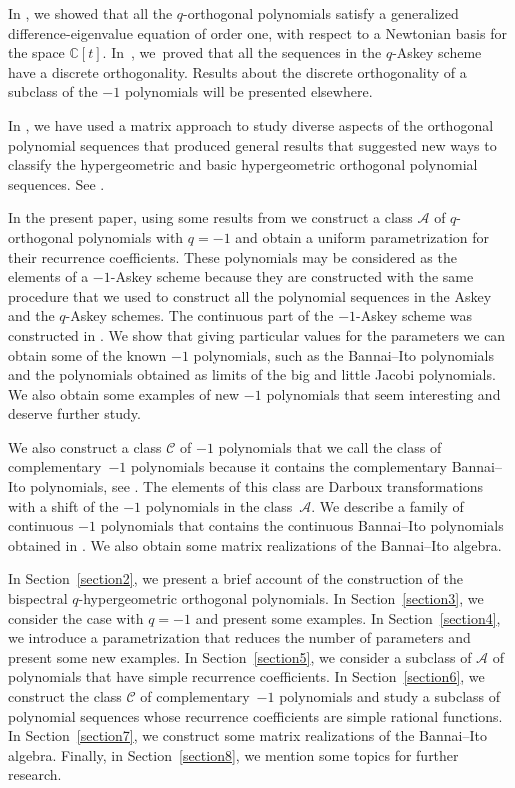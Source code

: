 \documentclass[pdftex]{sigma}
\def\cA{\mathcal A}
\def\cC{\mathcal C}
\numberwithin{equation}{section}
\begin{document}
In \cite{Uni}, we showed that all the $q$-orthogonal polynomials sat\-isfy a gen\-er\-al\-ized dif\-fer\-ence-eigenvalue equation of order one, with respect to a Newtonian basis for the space ${\mathbb C}[t]$. In~\cite{qdiscr}, we~proved that all the sequences in the $q$-Askey scheme have a discrete orthogonality. Results about the discrete orthogonality of a subclass of the $-1$ polynomials will be presented elsewhere.

In \cite{Mops, Rec, PSGH,Uni}, we have used a matrix approach to study diverse aspects of the orthogonal polynomial sequences that produced general results that suggested new ways to classify the hypergeometric and basic hypergeometric orthogonal polynomial sequences. See \cite{KAsk, K2, K3}.

In the present paper, using some results from \cite{Uni} we construct a class $\cA$ of $q$-orthogonal polynomials with $q=-1$ and obtain a uniform parametrization for their recurrence coefficients. These polynomials may be considered as the elements of a $-1$-Askey scheme because they are constructed with the same procedure that we used to construct all the polynomial sequences in the Askey and the $q$-Askey schemes. The continuous part of the $-1$-Askey scheme was constructed in \cite{PellVZ}. We show that giving particular values for the parameters we can obtain some of the known $-1$ polynomials, such as the Bannai--Ito polynomials and the polynomials obtained as limits of the big and little Jacobi polynomials. We also obtain some examples of new $-1$ polynomials that seem interesting and deserve further study.

We also construct a class $\cC$ of $-1$ polynomials that we call the class of complementary~$-1$ polynomials because it contains the complementary Bannai--Ito polynomials, see \cite{GenVZ2,TsujiDunkl}. The elements of this class are Darboux transformations with a shift of the $-1$ polynomials in the class~$\cA$.
We describe a family of continuous $-1$ polynomials that contains the continuous Bannai--Ito polynomials obtained in \cite{PellVZ}. We also obtain some matrix realizations of the Bannai--Ito algebra.

In Section~\ref{section2}, we present a brief account of the construction of the bispectral $q$-hypergeometric orthogonal polynomials. In Section~\ref{section3}, we consider the case with $q=-1$ and present some examples. In Section~\ref{section4}, we introduce a parametrization that reduces the number of parameters and present some new examples. In Section~\ref{section5}, we consider a subclass of $\cA$ of polynomials that have simple recurrence coefficients. In Section~\ref{section6}, we construct the class $\cC$ of complementary~$-1$ polynomials and study a subclass of polynomial sequences whose recurrence coefficients are simple rational functions. In Section~\ref{section7}, we construct some matrix realizations of the Bannai--Ito algebra.
Finally, in Section~\ref{section8}, we mention some topics for further research.
\end{document}
